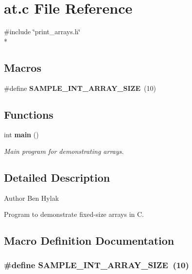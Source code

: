 \section{at.\+c File Reference}
\label{at_8c}
{\ttfamily \#include \char`\"{}print\+\_\+arrays.\+h\char`\"{}}\\*
\subsection*{Macros}
\begin{DoxyCompactItemize}
\item 
\#define {\bf S\+A\+M\+P\+L\+E\+\_\+\+I\+N\+T\+\_\+\+A\+R\+R\+A\+Y\+\_\+\+S\+I\+ZE}~(10)
\end{DoxyCompactItemize}
\subsection*{Functions}
\begin{DoxyCompactItemize}
\item 
int {\bf main} ()
\begin{DoxyCompactList}\small\item\em Main program for demonstrating arrays. \end{DoxyCompactList}\end{DoxyCompactItemize}


\subsection{Detailed Description}
\begin{DoxyAuthor}{Author}
Ben Hylak
\end{DoxyAuthor}
Program to demonstrate fixed-\/size arrays in C. 

\subsection{Macro Definition Documentation}
\subsubsection[{S\+A\+M\+P\+L\+E\+\_\+\+I\+N\+T\+\_\+\+A\+R\+R\+A\+Y\+\_\+\+S\+I\+ZE}]{\setlength{\rightskip}{0pt plus 5cm}\#define S\+A\+M\+P\+L\+E\+\_\+\+I\+N\+T\+\_\+\+A\+R\+R\+A\+Y\+\_\+\+S\+I\+ZE~(10)}\label{at_8c_a50ed2820dbc6ed0f254032ff09a55a4f}


